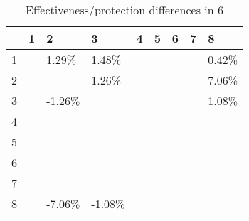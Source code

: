 \begin{table}[ht]
\centering
\begin{tabular}{rllllllll}
  \hline
 & 1 & 2 & 3 & 4 & 5 & 6 & 7 & 8 \\ 
  \hline
1 &  & 1.29\% & 1.48\% &  &  &  &  & 0.42\% \\ 
  2 &  &  & 1.26\% &  &  &  &  & 7.06\% \\ 
  3 &  & -1.26\% &  &  &  &  &  & 1.08\% \\ 
  4 &  &  &  &  &  &  &  &  \\ 
  5 &  &  &  &  &  &  &  &  \\ 
  6 &  &  &  &  &  &  &  &  \\ 
  7 &  &  &  &  &  &  &  &  \\ 
  8 &  & -7.06\% & -1.08\% &  &  &  &  &  \\ 
   \hline
\end{tabular}
\caption{Effectiveness/protection differences in  6} 
\end{table}
